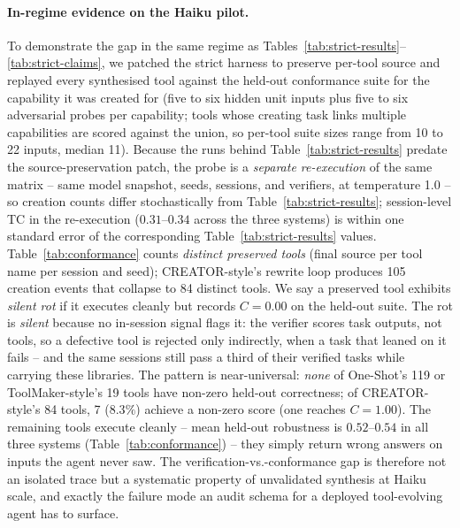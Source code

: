 \documentclass[sigconf,anonymous,review,natbib=false]{acmart}
\begin{document}
\paragraph{In-regime evidence on the Haiku pilot.} To demonstrate the gap in the same regime as Tables~\ref{tab:strict-results}--\ref{tab:strict-claims}, we patched the strict harness to preserve per-tool source and replayed every synthesised tool against the held-out conformance suite for the capability it was created for (five to six hidden unit inputs plus five to six adversarial probes per capability; tools whose creating task links multiple capabilities are scored against the union, so per-tool suite sizes range from 10 to 22 inputs, median 11). Because the runs behind Table~\ref{tab:strict-results} predate the source-preservation patch, the probe is a \emph{separate re-execution} of the same matrix -- same model snapshot, seeds, sessions, and verifiers, at temperature 1.0 -- so creation counts differ stochastically from Table~\ref{tab:strict-results}; session-level TC in the re-execution ($0.31$--$0.34$ across the three systems) is within one standard error of the corresponding Table~\ref{tab:strict-results} values. Table~\ref{tab:conformance} counts \emph{distinct preserved tools} (final source per tool name per session and seed); CREATOR-style's rewrite loop produces 105 creation events that collapse to 84 distinct tools. We say a preserved tool exhibits \emph{silent rot} if it executes cleanly but records $C{=}0.00$ on the held-out suite. The rot is \emph{silent} because no in-session signal flags it: the verifier scores task outputs, not tools, so a defective tool is rejected only indirectly, when a task that leaned on it fails -- and the same sessions still pass a third of their verified tasks while carrying these libraries. The pattern is near-universal: \emph{none} of One-Shot's 119 or ToolMaker-style's 19 tools have non-zero held-out correctness; of CREATOR-style's 84 tools, 7 ($8.3\%$) achieve a non-zero score (one reaches $C{=}1.00$). The remaining tools execute cleanly -- mean held-out robustness is $0.52$--$0.54$ in all three systems (Table~\ref{tab:conformance}) -- they simply return wrong answers on inputs the agent never saw. The verification-vs.-conformance gap is therefore not an isolated trace but a systematic property of unvalidated synthesis at Haiku scale, and exactly the failure mode an audit schema for a deployed tool-evolving agent has to surface.
\end{document}
